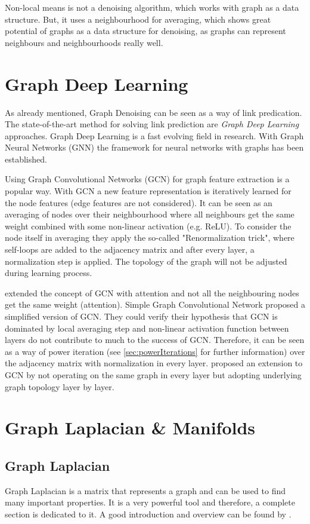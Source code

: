 Non-local means is not a denoising algorithm, which works with graph as a data structure.
But, it uses a neighbourhood for averaging, which shows great potential of graphs
as a data structure for denoising, as graphs can represent neighbours and neighbourhoods really well.


\section{Graph Deep Learning}
\label{sec:graph_depp_learning}
As already mentioned, Graph Denoising can be seen as a way of link predication. 
The state-of-the-art method for solving link prediction are \textit{Graph Deep Learning} approaches.
Graph Deep Learning is a fast evolving field in research. With Graph Neural Networks (GNN) \cite{GNN} the framework
for neural networks with graphs has been established. 

Using Graph Convolutional Networks (GCN) \cite{GCN} for graph feature extraction is a popular way. 
With GCN a new feature representation is iteratively learned for the node features (edge features are not considered).
It can be seen as an averaging of nodes over their neighbourhood where all neighbours get the same weight combined with some non-linear activation (e.g. ReLU). 
To consider the node itself in averaging they apply the so-called "Renormalization trick", where self-loops are added to the 
adjacency matrix and after every layer, a normalization step is applied. 
The topology of the graph will not be adjusted during  learning process.

\citet{GAT} extended the concept of GCN with attention and not all the neighbouring nodes get the same weight (attention).
Simple Graph Convolutional Network \cite{simpleGCN} proposed a simplified version of GCN.
They could verify their hypothesis that GCN is dominated by local averaging step and non-linear 
activation function between layers do not contribute to much to the success of GCN. 
Therefore, it can be seen as a way of power iteration (see \ref{sec:powerIterations} for further information) over the adjacency matrix with normalization in every layer.
\citet{dynamicGCN} proposed an extension to GCN by not operating on the same graph in every layer but adopting
underlying graph topology layer by layer.

\section{Graph Laplacian \& Manifolds}
\subsection{Graph Laplacian}
Graph Laplacian is a matrix that represents a graph and can be used to find many important properties.
It is a very powerful tool and therefore, a complete section is dedicated to it.
A good introduction and overview can be found by \cite{tutorialSpectralClustering, SpectralGraphTheory}. 

